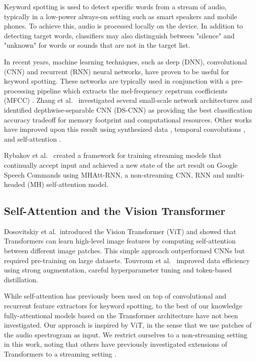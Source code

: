 \documentclass[a4paper]{article}
\begin{document}
Keyword spotting is used to detect specific words from a stream of audio, typically in a low-power always-on setting such as smart speakers and mobile phones. To achieve this, audio is processed locally on the device. In addition to detecting target words, classifiers may also distinguish between "silence" and "unknown" for words or sounds that are not in the target list.

In recent years, machine learning techniques, such as deep (DNN), convolutional (CNN) and recurrent (RNN) neural networks, have proven to be useful for keyword spotting. These networks are typically used in conjunction with a pre-processing pipeline which extracts the mel-frequency cepstrum coefficients (MFCC) \cite{davis1980comparison}. Zhang et al.\ \cite{zhang2017hello} investigated several small-scale network architectures and identified depthwise-separable CNN (DS-CNN) as providing the best classification accuracy tradeoff for memory footprint and computational resources. Other works have improved upon this result using synthesized data \cite{lin2020training}, temporal convolutions \cite{choi2019temporal, majumdar2020matchboxnet}, and self-attention \cite{de2018neural}.

Rybakov et al.\ \cite{rybakov2020streaming} created a framework for training streaming models that continually accept input and achieved a new state of the art result on Google Speech Commands using MHAtt-RNN, a non-streaming CNN, RNN and multi-headed (MH) self-attention model.

\subsection{Self-Attention and the Vision Transformer}

Dosovitskiy et al.\ introduced the Vision Transformer (ViT) \cite{dosovitskiy2020image} and showed that Transformers can learn high-level image features by computing self-attention between different image patches. This simple approach outperformed CNNs but required pre-training on large datasets. Touvroun et al.\ \cite{touvron2020training} improved data efficiency using strong augmentation, careful hyperparameter tuning and token-based distillation.

While self-attention has previously been used on top of convolutional and recurrent feature extractors for keyword spotting, to the best of our knowledge fully-attentional models based on the Transformer architecture \cite{vaswani2017attention} have not been investigated. Our approach is inspired by ViT, in the sense that we use patches of the audio spectrogram as input. We restrict ourselves to a non-streaming setting in this work, noting that others have previously investigated extensions of Transformers to a streaming setting \cite{chenwu2020streaming}.
\end{document}

